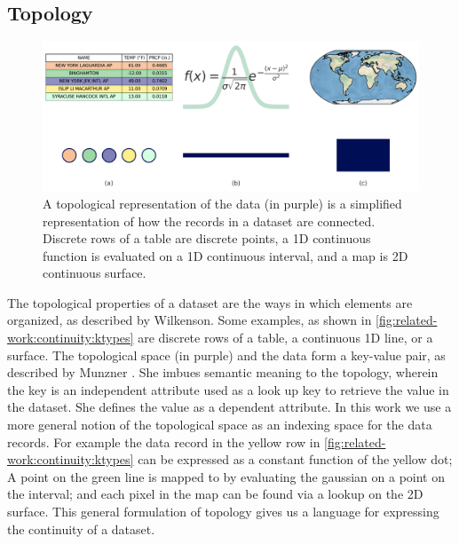 \documentclass[10pt,journal,compsoc]{IEEEtran}
\theoremstyle{definition}
\theoremstyle{remark}
\begin{document}
\subsection{Topology}
\label{sec:related-work:continuity}
\begin{figure}[h!]
  \label{fig:related-work:continuity:ktypes}
  \includegraphics[width=1\columnwidth]{k_different_types.png}
  \caption{A topological representation of the data (in purple) is a simplified representation of how the records in a dataset are connected. Discrete rows of a table are discrete points, a 1D continuous function is evaluated on a 1D continuous interval, and a map is 2D continuous surface. }
\end{figure}
The topological properties of a dataset are the ways in which elements are organized, as described by Wilkenson\cite{wilkinsonGrammarGraphics2005}. Some examples, as shown in \autoref{fig:related-work:continuity:ktypes} are discrete rows of a table, a continuous 1D line, or a surface. The topological space (in purple) and the data form a key-value pair, as described by Munzner \cite{munznerVisualizationAnalysisDesign2014}. She imbues semantic meaning to the topology, wherein the key is an independent attribute used as a look up key to retrieve the value in the dataset. She defines the value as a dependent attribute. In this work we use a more general notion of the topological space as an indexing space for the data records. For example the data record in the yellow row in \autoref{fig:related-work:continuity:ktypes} can be expressed as a constant function of the yellow dot; A point on the green line is mapped to by evaluating the gaussian on a point on the interval; and each pixel in the map can be found via a lookup on the 2D surface. This general formulation of topology gives us a language for expressing the continuity of a dataset. 
\end{document}
